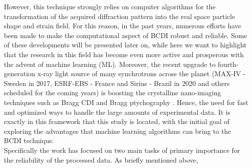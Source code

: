 However, this technique strongly relies on computer algorithms for the transformation of the acquired diffraction pattern into 
the real space particle shape and strain field. For this reason, in the past years, numerous efforts have been made  
to make the computational aspect of BCDI robust and reliable. Some of these developments will be presented later on, while 
here we want to highlight that the research in this field has become even more active and prosperous with the advent of machine 
learning (ML). Moreover, the recent upgrade to fourth-generation x-ray light source of many synchrotrons across the planet 
(MAX-IV - Sweden in 2017, ESRF-EBS - France and Sirius - Brazil in 2020 and others scheduled for the coming years) is 
boosting the crystalline nano-imaging techniques such as Bragg CDI and Bragg ptychography \cite{Li2022, Leake:il5024}. 
Hence, the need for fast and optimized ways to handle the large amounts of experimental data. It is exactly in this framework 
that this study is located, with the initial goal of exploring the advantages that machine learning algorithms can bring 
to the BCDI technique. \\
Specifically the work has focused on two main tasks of primary importance for the reliability of the processed data. 
As briefly mentioned above,  


